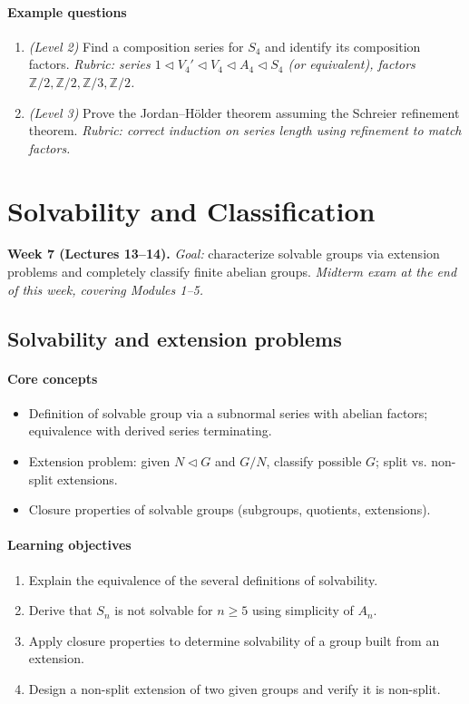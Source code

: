 \documentclass{article}
\begin{document}
\paragraph{Example questions}
\begin{enumerate}[nosep]
  \item \emph{(Level 2)} Find a composition series for $S_4$ and identify its composition factors. \emph{Rubric: series $1 \triangleleft V_4' \triangleleft V_4 \triangleleft A_4 \triangleleft S_4$ (or equivalent), factors $\mathbb{Z}/2,\mathbb{Z}/2,\mathbb{Z}/3,\mathbb{Z}/2$.}
  \item \emph{(Level 3)} Prove the Jordan--H\"older theorem assuming the Schreier refinement theorem. \emph{Rubric: correct induction on series length using refinement to match factors.}
\end{enumerate}

\section{Solvability and Classification}
\textbf{Week 7 (Lectures 13--14).} \emph{Goal:} characterize solvable groups via extension problems and completely classify finite abelian groups. \emph{Midterm exam at the end of this week, covering Modules 1--5.}

\subsection{Solvability and extension problems}
\paragraph{Core concepts}
\begin{itemize}[nosep]
  \item Definition of solvable group via a subnormal series with abelian factors; equivalence with derived series terminating.
  \item Extension problem: given $N \triangleleft G$ and $G/N$, classify possible $G$; split vs. non-split extensions.
  \item Closure properties of solvable groups (subgroups, quotients, extensions).
\end{itemize}
\paragraph{Learning objectives}
\begin{enumerate}[nosep]
  \item Explain the equivalence of the several definitions of solvability.
  \item Derive that $S_n$ is not solvable for $n \geq 5$ using simplicity of $A_n$.
  \item Apply closure properties to determine solvability of a group built from an extension.
  \item Design a non-split extension of two given groups and verify it is non-split.
\end{enumerate}
\end{document}
